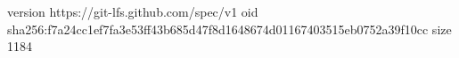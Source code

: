 version https://git-lfs.github.com/spec/v1
oid sha256:f7a24cc1ef7fa3e53ff43b685d47f8d1648674d01167403515eb0752a39f10cc
size 1184
